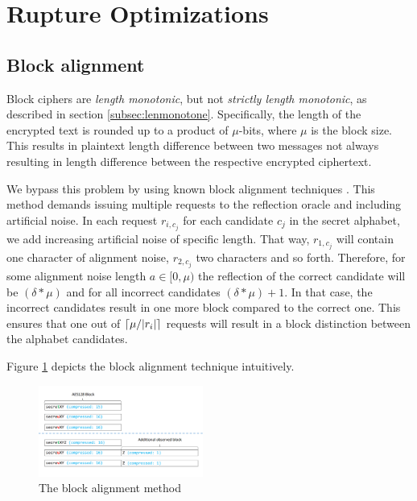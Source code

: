 \section{Rupture Optimizations}\label{subsec:optimizations}

\subsection{Block alignment}\label{subsec:blockalign}
Block ciphers are \textit{length monotonic}, but not \textit{strictly length
monotonic}, as described in section \ref{subsec:lenmonotone}. Specifically, the
length of the encrypted text is rounded up to a product of $\mu$-bits, where
$\mu$ is the block size. This results in plaintext length difference between two
messages not always resulting in length difference between the respective
encrypted ciphertext.

We bypass this problem by using known block alignment techniques
\cite{moller2014poodle}. This method demands issuing multiple requests to the
reflection oracle and including artificial noise. In each request $r_{i, c_j}$
for each candidate $c_j$ in the secret alphabet, we add increasing artificial
noise of specific length. That way, $r_{1, c_j}$ will contain one character
of alignment noise, $r_{2, c_j}$ two characters and so forth. Therefore, for
some alignment noise length $a \in [0, \mu)$ the reflection of the correct
candidate will be $(\delta*\mu)$ and for all incorrect candidates
$(\delta*\mu)+1$. In that case, the incorrect candidates result in one more
block compared to the correct one. This ensures that one out of $\lceil\mu /
|r_i|\rceil$ requests will result in a block distinction between the alphabet
candidates.

Figure \ref{fig:block_alignment} depicts the block alignment technique
intuitively.

   \begin{figure}[thpb]
      \centering
          \includegraphics[width=0.48\textwidth]{figures/block_alignment.png}
      \caption{The block alignment method}
      \label{fig:block_alignment}
   \end{figure}


